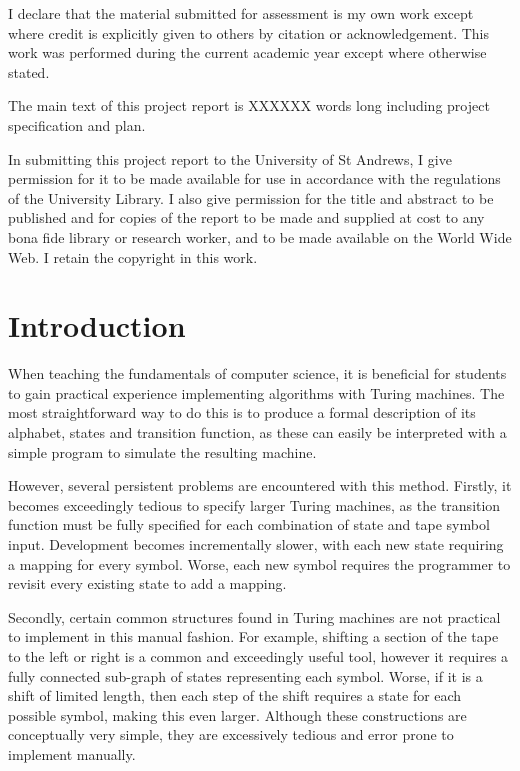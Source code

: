 \documentclass[11pt]{article}
\begin{document}
I declare that the material submitted for assessment is my own work except where credit is explicitly given to others by citation or acknowledgement. This work was performed during the current academic year except where otherwise stated.

The main text of this project report is XXXXXX words long including project specification and plan.

In submitting this project report to the University of St Andrews, I give permission for it to be made available for use in accordance with the regulations of the University Library. I also give permission for the title and abstract to be published and for copies of the report to be made and supplied at cost to any bona fide library or research worker, and to be made available on the World Wide Web. I retain the copyright in this work.

\tableofcontents
\newpage

\section{Introduction}

When teaching the fundamentals of computer science, it is beneficial for students to gain practical experience implementing algorithms with Turing machines. The most straightforward way to do this is to produce a formal description of its alphabet, states and transition function, as these can easily be interpreted with a simple program to simulate the resulting machine.

However, several persistent problems are encountered with this method. Firstly, it becomes exceedingly tedious to specify larger Turing machines, as the transition function must be fully specified for each combination of state and tape symbol input. Development becomes incrementally slower, with each new state requiring a mapping for every symbol. Worse, each new symbol requires the programmer to revisit every existing state to add a mapping.

Secondly, certain common structures found in Turing machines are not practical to implement in this manual fashion. For example, shifting a section of the tape to the left or right is a common and exceedingly useful tool, however it requires a fully connected sub-graph of states representing each symbol. Worse, if it is a shift of limited length, then each step of the shift requires a state for each possible symbol, making this even larger. Although these constructions are conceptually very simple, they are excessively tedious and error prone to implement manually.
\end{document}
